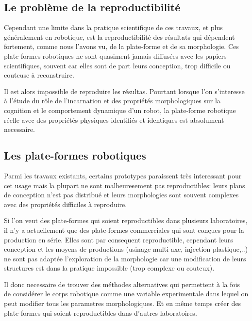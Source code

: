 \subsection*{Le problème de la reproductibilité}

Cependant une limite dans la pratique scientifique de ces travaux, et plus généralement en robotique, est la reproductibilité des résultats qui dépendent  fortement, comme nous l'avons vu, de la plate-forme et de sa morphologie. Ces plate-formes robotiques ne sont quasiment jamais diffusées avec les papiers scientifiques, souvent car elles sont de part leurs conception, trop difficile ou couteuse à reconstruire.

Il est alors impossible de reproduire les résultas. Pourtant lorsque l'on s'interesse à l'étude du rôle de l'incarnation et des propriétés morphologiques sur la cognition et le comportement dynamique d'un robot, la plate-forme robotique réelle avec des propriétés physiques identifiés et identiques est absolument necessaire.

\subsection*{Les plate-formes robotiques}
\label{sub:Les plate-formes robotiques}

Parmi les travaux existants, certains prototypes paraissent très interessant pour cet usage mais la plupart ne sont malheuresement pas reproductibles: leurs plans de conception n'est pas distribué et leurs morphologies sont souvent complexes avec des propriétés difficiles à reproduire.

Si l'on veut des plate-formes qui soient reproductibles dans plusieurs laboratoires, il n'y a actuellement que des plate-formes commerciales qui sont conçues pour la production en série. Elles sont par consequent reproductible, cependant leurs conception et les moyens de productions (usinage multi-axe, injection plastique,..) ne sont pas adaptée l'exploration de la morphologie car une modification de leurs structures est dans la pratique impossible (trop complexe ou couteux).

Il donc necessaire de trouver des méthodes alternatives qui permettent à la fois de considérer le corps robotique comme une variable experimentale dans lequel on peut modifier tous les parametres morphologiques. Et en même temps créer des plate-formes qui soient reproductibles dans d'autres laboratoires.

